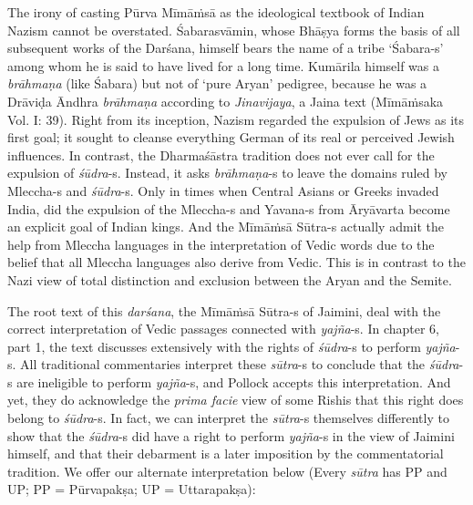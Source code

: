 The irony of casting Pūrva Mīmāṁsā as the ideological textbook of Indian Nazism cannot be overstated. Śabarasvāmin, whose Bhāṣya forms the basis of all subsequent works of the Darśana, himself bears the name of a tribe ‘Śabara-s’ among whom he is said to have lived for a long time. Kumārila himself was a \textit{brāhmaṇa} (like Śabara) but not of ‘pure Aryan’ pedigree, because he was a Drāviḍa Āndhra \textit{brāhmaṇa} according to \textit{Jinavijaya}, a Jaina text (Mīmāṁsaka Vol. I: 39). Right from its inception, Nazism regarded the expulsion of Jews as its first goal; it sought to cleanse everything German of its real or perceived Jewish influences. In contrast, the Dharmaśāstra tradition does not ever call for the expulsion of \textit{śūdra}-s. Instead, it asks \textit{brāhmaṇa}-s to leave the domains ruled by Mleccha-s and \textit{śūdra}-s. Only in times when Central Asians or Greeks invaded India, did the expulsion of the Mleccha-s and Yavana-s from Āryāvarta become an explicit goal of Indian kings. And the Mīmāṁsā Sūtra-s actually admit the help from Mleccha languages in the interpretation of Vedic words due to the belief that all Mleccha languages also derive from Vedic. This is in contrast to the Nazi view of total distinction and exclusion between the Aryan and the Semite.

The root text of this \textit{darśana}, the Mīmāṁsā Sūtra-s of Jaimini, deal with the correct interpretation of Vedic passages connected with \textit{yajña}-s. In chapter 6, part 1, the text discusses extensively with the rights of \textit{śūdra}-s to perform \textit{yajña}-s. All traditional commentaries interpret these \textit{sūtra}-s to conclude that the \textit{śūdra}-s are ineligible to perform \textit{yajña}-s, and Pollock accepts this interpretation. And yet, they do acknowledge the \textit{prima facie} view of some Rishis that this right does belong to \textit{śūdra}-s. In fact, we can interpret the \textit{sūtra}-s themselves differently to show that the \textit{śūdra}-s did have a right to perform \textit{yajña}-s in the view of Jaimini himself, and that their debarment is a later imposition by the commentatorial tradition. We offer our alternate interpretation below (Every \textit{sūtra} has PP and UP; PP = Pūrvapakṣa; UP = Uttarapakṣa):

